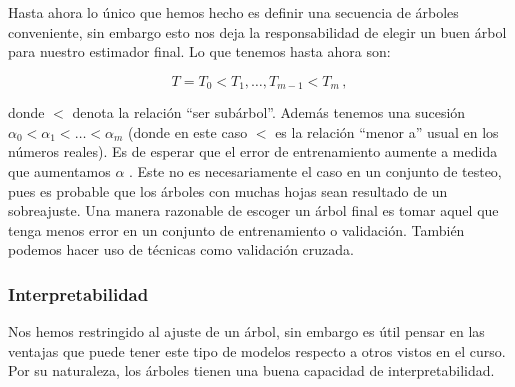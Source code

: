 Hasta ahora lo único que hemos hecho es definir una secuencia de árboles conveniente, sin embargo esto nos deja la responsabilidad de elegir un buen árbol para nuestro estimador final. Lo que tenemos hasta ahora son:

\begin{equation}
    T = T_0 < T_1, \dots, T_{m-1} < T_m \,,
\end{equation}

donde $<$ denota la relación ``ser subárbol''. Además tenemos una sucesión $\alpha_0 < \alpha_1 < \dots < \alpha_m$ (donde en este caso $<$ es la relación ``menor a'' usual en los números reales). Es de esperar que el error de entrenamiento aumente a medida que aumentamos $\alpha$ . Este no es necesariamente el caso en un conjunto de testeo, pues es probable que los árboles con muchas hojas sean resultado de un sobreajuste. Una manera razonable de escoger un árbol final es tomar aquel que tenga menos error en un conjunto de entrenamiento o validación. También podemos hacer uso de técnicas como validación cruzada.


\subsubsection{Interpretabilidad}

Nos hemos restringido al ajuste de un árbol, sin embargo es útil pensar en las ventajas que puede tener este tipo de modelos respecto a otros vistos en el curso. Por su naturaleza, los árboles tienen una buena capacidad de interpretabilidad. %

